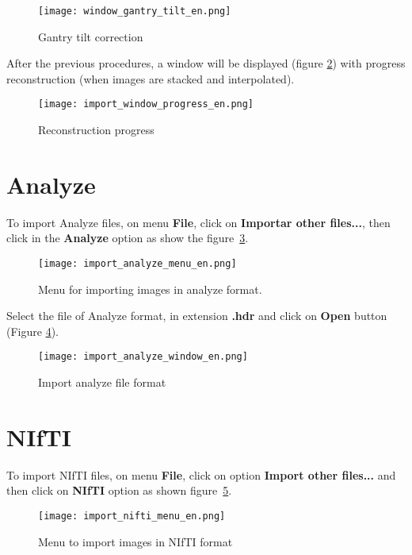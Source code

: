 \begin{figure}[!htb]
\centering
\texttt{[image: window\_gantry\_tilt\_en.png]}
\caption{Gantry tilt correction}
\label{fig:gantry_tilt}
\end{figure}

After the previous procedures, a window will be displayed (figure \ref{fig:prog_recons}) with progress reconstruction (when images are stacked and interpolated).

\begin{figure}[!htb]
\centering
\texttt{[image: import\_window\_progress\_en.png]} 
\caption{Reconstruction progress}
\label{fig:prog_recons}
\end{figure}

\newpage

\section{Analyze}

To import Analyze files, on menu \textbf{File}, click on \textbf{Importar other files...}, then click in the \textbf{Analyze} option as show the figure~\ref{fig:analyze_menu}.

\begin{figure}[!htb]
\centering
\texttt{[image: import\_analyze\_menu\_en.png]}
\caption{Menu for importing images in analyze format.}
\label{fig:analyze_menu}
\end{figure}

Select the file of Analyze format, in extension \textbf{.hdr} and click on \textbf{Open} button (Figure \ref{fig:analyze_import}).
 
\begin{figure}[!htb]
\centering
\texttt{[image: import\_analyze\_window\_en.png]}
\caption{Import analyze file format}
\label{fig:analyze_import}
\end{figure}

\section{NIfTI}

To import NIfTI files, on menu \textbf{File}, click on option \textbf{Import other files...} and then click on \textbf{NIfTI} option as shown figure~\ref{fig:import_nifti_menu_pt}.


\begin{figure}[!htb]
\centering
\texttt{[image: import\_nifti\_menu\_en.png]}
\caption{Menu to import images in NIfTI format}
\label{fig:import_nifti_menu_pt}
\end{figure}

